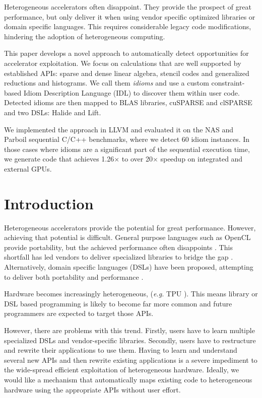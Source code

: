 
    Heterogeneous accelerators often disappoint.
    They provide the prospect of great performance, but only deliver it when
    using vendor specific optimized libraries or domain specific languages.
    This requires considerable legacy code modifications, hindering the adoption
    of heterogeneous computing.

    This paper develops a novel approach to automatically detect opportunities
    for accelerator exploitation.
    We focus on calculations that are well supported by established APIs: sparse
    and dense linear algebra, stencil codes and generalized reductions and
    histograms.
    We call them {\em idioms} and use a custom constraint-based Idiom
    Description Language (IDL) to discover them within user code.
    Detected idioms are then mapped to BLAS libraries, cuSPARSE and clSPARSE and
    two DSLs: Halide and Lift.

    We implemented the approach in LLVM and evaluated it on the NAS and Parboil
    sequential C/C++ benchmarks, where we detect 60 idiom instances.
    In those cases where idioms are a significant part of the sequential
    execution time, we generate code that achieves 1.26$\times$ to over
    20$\times$ speedup on integrated and external GPUs.

\section{Introduction}

    Heterogeneous accelerators provide the potential for great performance.
    However, achieving that potential is difficult.
    General purpose languages such as OpenCL \cite{nvidia11guide} provide
    portability, but the achieved performance often disappoints
    \cite{lee09openmp}.
    This shortfall has led vendors to deliver specialized libraries to bridge
    the gap \cite{clBlas-1}.  Alternatively, domain specific languages (DSLs)
    \cite{Franchetti09OL,Rompf:2012:LMS:2184319.2184345} have been proposed,
    attempting to deliver  both portability and performance
    \cite{Ragan-Kelley2013Halide}.

    Hardware becomes increasingly heterogeneous, ({\it e.g.} TPU
    \cite{jouppi2017datacenter}).
    This means library or DSL based programming is likely to become far more
    common and future programmers are expected to target those APIs.

    However, there are problems with this trend.
    Firstly, users have to learn multiple specialized DSLs and vendor-specific
    libraries.
    Secondly, users have to restructure and rewrite their applications to use
    them.
    Having to learn and understand several new APIs and then rewrite existing
    applications is a severe impediment to the wide-spread efficient
    exploitation of heterogeneous hardware.
    Ideally, we would like a mechanism that automatically maps existing code to
    heterogeneous hardware using the appropriate APIs without user effort.

